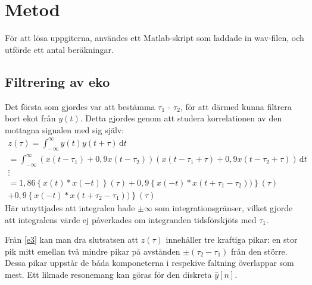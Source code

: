 \documentclass[10pt,twocolumn]{article}
\begin{document}
\section{Metod}

För att lösa uppgiterna, användes ett Matlab-skript som laddade in wav-filen,
och utförde ett antal beräkningar.
\subsection{Filtrering av eko}

Det första som gjordes var att bestämma $\tau_1$ - $\tau_2$, för att därmed
kunna filtrera bort ekot från $y(t)$. Detta gjordes genom att studera korrelationen
av den mottagna signalen med sig själv:
\begin{multline}
    z(\tau) = \int_{-\infty}^{\infty}\!y(t)y(t+\tau)\, \mathrm{d}t \\  
    = \int_{-\infty}^{\infty}\!(x(t-\tau_1)+0,9 x(t-\tau_2))(x(t-\tau_1+\tau)+0,9 x(t-\tau_2+\tau))\, \mathrm{d}t \\
    \vdots \\
    = 1,86\left\{x(t) \ast x(-t)\right\}(\tau) + 
    0,9\left\{x(-t) \ast x(t+\tau_1-\tau_2))\right\}(\tau)\\ + 
    0,9\left\{x(-t) \ast x(t+\tau_2-\tau_1))\right\}(\tau)
    \label{e3}
\end{multline}
Här utnyttjades att integralen hade $\pm\infty$ som integrationsgränser, vilket gjorde att integralens värde ej
påverkades om integranden tidsförskjöts med $\tau_1$.

Från \ref{e3} kan man dra slutsatsen att $z(\tau)$ innehåller tre kraftiga pikar: en stor pik mitt emellan två mindre
pikar på avstånden $\pm(\tau_2 - \tau_1)$ från den större. Dessa pikar uppstår de båda komponeterna i respekive faltning
överlappar som mest. Ett liknade resonemang kan göras för den diskreta $\hat{y}[n]$.
\end{document}
